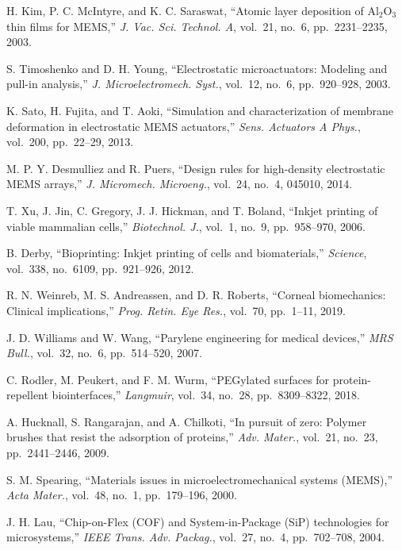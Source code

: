 \documentclass[conference]{IEEEtran}
\begin{document}
\begin{thebibliography}{99}

H. Kim, P. C. McIntyre, and K. C. Saraswat,
``Atomic layer deposition of Al$_2$O$_3$ thin films for MEMS,''
\emph{J. Vac. Sci. Technol. A}, vol.~21, no.~6, pp.~2231--2235, 2003.

S. Timoshenko and D. H. Young,
``Electrostatic microactuators: Modeling and pull-in analysis,''
\emph{J. Microelectromech. Syst.}, vol.~12, no.~6, pp.~920--928, 2003.

K. Sato, H. Fujita, and T. Aoki,
``Simulation and characterization of membrane deformation in electrostatic MEMS actuators,''
\emph{Sens. Actuators A Phys.}, vol.~200, pp.~22--29, 2013.

M. P. Y. Desmulliez and R. Puers,
``Design rules for high-density electrostatic MEMS arrays,''
\emph{J. Micromech. Microeng.}, vol.~24, no.~4, 045010, 2014.

T. Xu, J. Jin, C. Gregory, J. J. Hickman, and T. Boland,
``Inkjet printing of viable mammalian cells,''
\emph{Biotechnol. J.}, vol.~1, no.~9, pp.~958--970, 2006.

B. Derby,
``Bioprinting: Inkjet printing of cells and biomaterials,''
\emph{Science}, vol.~338, no.~6109, pp.~921--926, 2012.

R. N. Weinreb, M. S. Andreassen, and D. R. Roberts,
``Corneal biomechanics: Clinical implications,''
\emph{Prog. Retin. Eye Res.}, vol.~70, pp.~1--11, 2019.

J. D. Williams and W. Wang,
``Parylene engineering for medical devices,''
\emph{MRS Bull.}, vol.~32, no.~6, pp.~514--520, 2007.

C. Rodler, M. Peukert, and F. M. Wurm,
``PEGylated surfaces for protein-repellent biointerfaces,''
\emph{Langmuir}, vol.~34, no.~28, pp.~8309--8322, 2018.

A. Hucknall, S. Rangarajan, and A. Chilkoti,
``In pursuit of zero: Polymer brushes that resist the adsorption of proteins,''
\emph{Adv. Mater.}, vol.~21, no.~23, pp.~2441--2446, 2009.

S. M. Spearing,
``Materials issues in microelectromechanical systems (MEMS),''
\emph{Acta Mater.}, vol.~48, no.~1, pp.~179--196, 2000.

J. H. Lau,
``Chip-on-Flex (COF) and System-in-Package (SiP) technologies for microsystems,''
\emph{IEEE Trans. Adv. Packag.}, vol.~27, no.~4, pp.~702--708, 2004.

\end{thebibliography}
\end{document}
